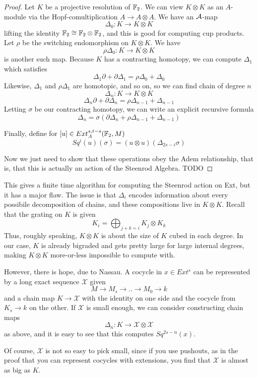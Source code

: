 \begin{proof}
  Let $K$ be a projective resolution of $\mathbb{F}_2$.
  We can view $K\otimes K$ as an $A$-module via the Hopf-comultiplication $A\to A\otimes A$.  
  We have an $\mathcal{A}$-map 
  \[\Delta_0:K\to K\otimes K\]
  lifting the identity $\mathbb{F}_2\cong \mathbb{F}_2\otimes \mathbb{F}_2$, and this is good for computing cup products. 
  Let $\rho$ be the switching endomorphism on $K\otimes K$.  
  We have
  \[\rho\Delta_0 : K\to K\otimes K\]
  is another such map.  
  Because $K$ has a contracting homotopy, we can compute $\Delta_1$ which satisfies
  \[\Delta_1\partial + \partial\Delta_1 = \rho\Delta_0+\Delta_0\]
  Likewise, $\Delta_1$ and $\rho\Delta_1$ are homotopic, and so on, so we can find chain of degree $n$
  \[\Delta_n :K\to K\otimes K\]
  \[\Delta_n\partial + \partial\Delta_n = \rho\Delta_{n-1}+\Delta_{n-1}\]
  Letting $\sigma$ be our contracting homotopy, we can write an explicit recursive formula
  \[\Delta_n = \sigma(\partial\Delta_n + \rho\Delta_{n-1}+\Delta_{n-1})\]
  
  Finally, define for $[u]\in Ext_A^{s,t-s}(\mathbb{F}_2,M)$
  \[Sq^i(u)(\sigma) = (u\otimes u)(\Delta_{2s-i}\sigma)\]

  Now we just need to show that these operations obey the Adem relationship, that is, that this is actually an action of the Steenrod Algebra.  TODO

  \end{proof}

This gives a finite time algorithm for computing the Steenrod action on Ext, but it has a major flaw.  The issue is that $\Delta_i$ encodes information about every possibile decomposition of chains, and these compositions live in $K\otimes K$.  
Recall that the grating on $K$ is given
\[K_i=\bigoplus_{j+k=i} K_j\otimes K_k\]
Thus, roughly speaking, $K\otimes K$ is about the size of $K$ cubed in each degree.  
In our case, $K$ is already bigraded and gets pretty large for large internal degrees, making $K\otimes K$ more-or-less impossible to compute with. 

However, there is hope, due to Nassau.  
A cocycle in $x\in Ext^s$ can be represented by a long exact sequence $\mathcal{X}$ given
\[M\to M_s\to ..\to M_0\to k\]
and a chain map $K\to \mathcal{X}$ with the identity on one side and the cocycle from $K_s\to k$ on the other.  
If $\mathcal{X}$ is small enough, we can consider constructing chain maps
\[\Delta_n : K\to \mathcal{X}\otimes\mathcal{X}\]
as above, and it is easy to see that this computes $Sq^{2s-n}(x)$.  

Of course, $\mathcal{X}$ is not so easy to pick small, since if you use pushouts, as in the proof that you can represent cocycles with extensions, you find that $\mathcal{X}$ is almost as big as $K$.  


